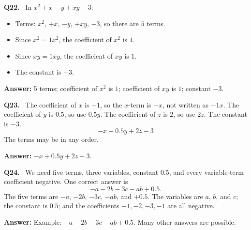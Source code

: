 \documentclass[12pt,a4paper]{article}
\newcommand{\solQ}[1]{\textbf{#1.}\ }
\newcommand{\ans}[1]{\par\noindent\textbf{Answer: }#1\par}
\begin{document}
\begin{solbox}
\solQ{Q22} In \(x^2+x-y+xy-3\):
\begin{itemize}
  \item Terms: \(x^2\), \(+x\), \(-y\), \(+xy\), \(-3\), so there are \(5\) terms.
  \item Since \(x^2=1x^2\), the coefficient of \(x^2\) is \(1\).
  \item Since \(xy=1xy\), the coefficient of \(xy\) is \(1\).
  \item The constant is \(-3\).
\end{itemize}
\ans{5 terms; coefficient of \(x^2\) is \(1\); coefficient of \(xy\) is \(1\); constant \(-3\).}
\end{solbox}

\begin{solbox}
\solQ{Q23} The coefficient of \(x\) is \(-1\), so the \(x\)-term is \(-x\), not written as \(-1x\). The coefficient of \(y\) is \(0.5\), so use \(0.5y\). The coefficient of \(z\) is \(2\), so use \(2z\). The constant is \(-3\).
\[
-x+0.5y+2z-3
\]
The terms may be in any order.
\ans{\(-x+0.5y+2z-3\).}
\end{solbox}

\begin{solbox}
\solQ{Q24} We need five terms, three variables, constant \(0.5\), and every variable-term coefficient negative. One correct answer is
\[
-a-2b-3c-ab+0.5.
\]
The five terms are \(-a\), \(-2b\), \(-3c\), \(-ab\), and \(+0.5\). The variables are \(a\), \(b\), and \(c\); the constant is \(0.5\); and the coefficients \(-1,-2,-3,-1\) are all negative.
\ans{Example: \(-a-2b-3c-ab+0.5\). Many other answers are possible.}
\end{solbox}
\end{document}

